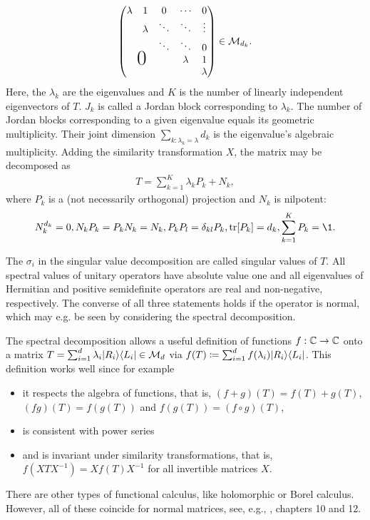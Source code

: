 \begin{theorem}
\begin{itemize}
\begin{align*}
\begin{pmatrix}
\lambda & 1       & 0      & \cdots  & 0      \\
        & \lambda & \ddots & \ddots  & \vdots \\
        &         & \ddots & \ddots  & 0      \\
        &         &        & \lambda & 1      \\
\smash{\makebox[0pt][l]{\hspace{0.75em}\raisebox{1em}{\text{\huge $0$}}}} & & & & \lambda
\end{pmatrix} \in \m M_{d_k}.
    \end{align*}
    Here, the $\lambda_k$ are the eigenvalues and $K$ is the number of linearly independent eigenvectors of $T$. $J_k$ is called a Jordan block corresponding to $\lambda_k$. The number of Jordan blocks corresponding to a given eigenvalue equals its geometric multiplicity. Their joint dimension $\sum_{k:\lambda_k = \lambda}d_k$ is the eigenvalue's algebraic multiplicity.  Adding the similarity transformation $X$, the matrix may be decomposed as 
    \begin{align*}
        T = \sum_{k=1}^K \lambda_k P_k + N_k,
    \end{align*}
    where $P_k$ is a (not necessarily orthogonal) projection and $N_k$ is nilpotent:
    \begin{align*}
        N_k^{d_k} = 0, N_kP_k =P_k N_k = N_k, P_kP_l = \delta_{kl}P_k , \tr[P_k]=d_k, \sum_{k=1}^K P_k = \1.
    \end{align*}
    {} 
\end{itemize}
\end{theorem}\noindent
The $\sigma_i$ in the singular value decomposition are called singular values of $T$. All spectral values of unitary operators have absolute value one and all eigenvalues of Hermitian and positive semidefinite operators are real and non-negative, respectively. The converse of all three statements holds if the operator is normal, which may e.g. be seen by considering the spectral decomposition.


The spectral decomposition allows a useful definition of functions $f: \mathbb{C} \rightarrow \mathbb{C}$ onto a matrix $T = \sum_{i=1}^d \lambda_i \lvert R_i\rangle\langle L_i\rvert\in \mathcal M_d$ via $f(T)\coloneqq \sum_{i=1}^df(\lambda_i)\lvert R_i\rangle\langle L_i\rvert$. This definition works well since for example
\begin{itemize}
    \item it respects the algebra of functions, that is, $(f+g)(T)=f(T)+g(T)$, $(fg)(T) = f(g(T))$ and $f(g(T))=(f\circ g)(T)$,
    \item is consistent with power series
    \item and is invariant under similarity transformations, that is, $f(XTX^{-1}) = Xf(T)X^{-1}$ for all invertible matrices $X$.
\end{itemize}
There are other types of functional calculus, like holomorphic or Borel calculus. However, all of these coincide for normal matrices, see, e.g., \cite{Rudin1990-xf}, chapters 10 and 12.

